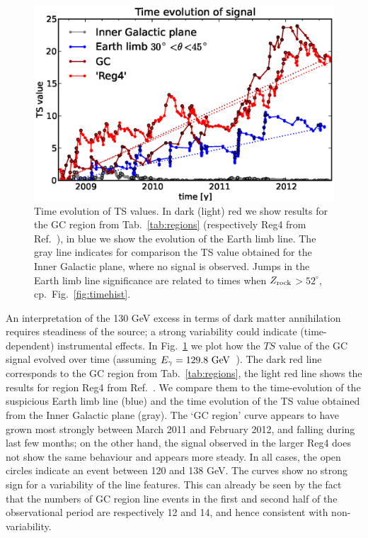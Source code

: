 \documentclass[aps,twocolumn,prd,superscriptaddress,showpacs,nofootinbib,fixfloat]{revtex4}
\newcommand{\GeV}{{\rm ~GeV}}
\newcommand{\zrock}{$Z_{\rm rock}$}
\begin{document}
\begin{figure}
  \begin{center}
    \includegraphics[width=1.0\linewidth]{plots/TS_time.eps}
  \end{center}
  \caption{Time evolution of TS values. In dark (light) red we show results
  for the GC region from Tab.~\ref{tab:regions} (respectively Reg4 from
  Ref.~\cite{Weniger:2012}), in blue we show the evolution of the Earth limb
  line. The gray line indicates for comparison the TS value obtained for the
  Inner Galactic plane, where no signal is observed.  Jumps in the Earth limb
  line significance are related to times when
  \zrock$>52^\circ$, cp.~Fig.~\ref{fig:timehist}.}
  \label{fig:timeevolution}
\end{figure}

An interpretation of the 130 GeV excess in
terms of dark matter annihilation requires steadiness of the source;
a strong variability could
indicate (time-dependent) instrumental effects. In
Fig.~\ref{fig:timeevolution} we plot how the $TS$ value of
the GC signal evolved over time (assuming $E_\gamma=129.8\GeV$~\cite{Weniger:2012}). 
The dark red line corresponds
to the GC region from Tab.~\ref{tab:regions}, the light red line shows the
results for region Reg4 from Ref.~\cite{Weniger:2012}. We
compare them to the time-evolution of the suspicious Earth limb
line (blue) and the time evolution of the TS value obtained from the
Inner Galactic plane (gray). The `GC region' curve appears to have grown most
strongly between March 2011 and February 2012, and falling
during last few months; on the other hand, the signal observed in the larger Reg4
does not show the same behaviour and appears more steady. In all cases, the open circles
indicate an event between 120 and 138 GeV.
The curves show no strong sign for a variability of the line features. This
can already be seen by the fact that the numbers of GC region line events in
the first and second half of the observational period are respectively 12 and
14, and hence consistent with non-variability.
\end{document}
